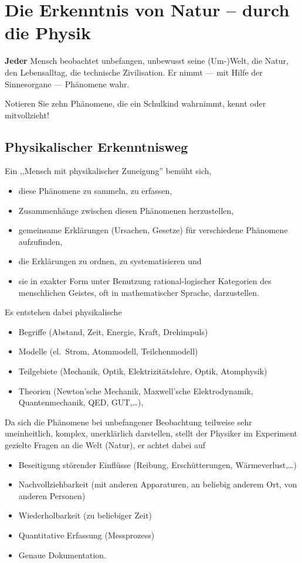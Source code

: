 \chapter{Die Erkenntnis von Natur -- durch die Physik}\label{Erkenntnis}

{\bf Jeder} Mensch beobachtet unbefangen, unbewusst seine (Um-)Welt, die Natur, den Lebensalltag,
die technische Zivilisation. Er nimmt --- mit Hilfe der Sinnesorgane --- Ph\"{a}nomene wahr.

\begin{uea}
	Notieren Sie zehn Ph\"{a}nomene, die ein Schulkind wahrnimmt, kennt oder mitvollzieht!
\end{uea}


\section{Physikalischer Erkenntnisweg}

Ein ,,Mensch mit physikalischer Zuneigung'' bem\"{u}ht sich,
\begin{itemize}
	\item diese Ph\"{a}nomene zu sammeln, zu erfassen,
	\item Zusammenh\"{a}nge zwischen diesen Ph\"{a}nomenen herzustellen,
	\item gemeinsame Erkl\"{a}rungen (Ursachen, Gesetze) f\"{u}r verschiedene Ph\"{a}nomene aufzufinden,
	\item die Erkl\"{a}rungen zu ordnen, zu systematisieren \quad und
	\item sie in exakter Form unter Benutzung rational-logischer Kategorien des menschlichen Geistes, oft in mathematischer Sprache, darzustellen.
\end{itemize}

Es entstehen dabei physikalische
\begin{itemize}
	\item Begriffe (Abstand, Zeit, Energie, Kraft, Drehimpuls)
	\item Modelle (el.\ Strom, Atommodell, Teilchenmodell)
	\item Teilgebiete (Mechanik, Optik, Elektrizit\"{a}tslehre, Optik, Atomphysik)
	\item Theorien (Newton'sche Mechanik, Maxwell'sche Elektrodynamik, Quantenmechanik, QED, GUT,\dots),
\end{itemize}

\mip
Da sich die Ph\"{a}nomene bei unbefangener Beobachtung teilweise sehr uneinheitlich, komplex,
unerkl\"{a}rlich darstellen, stellt der Physiker im Experiment gezielte Fragen an die Welt (Natur),
er achtet dabei auf
\begin{itemize}
	\item Beseitigung st\"{o}render Einfl\"{u}sse (Reibung, Ersch\"{u}tterungen, W\"{a}rmeverlust,\dots )
	\item Nachvollziehbarkeit (mit anderen Apparaturen, an beliebig anderem Ort, von anderen Personen)
	\item Wiederholbarkeit (zu beliebiger Zeit)
	\item Quantitative Erfassung (Messprozess)
	\item Genaue Dokumentation.
\end{itemize}

